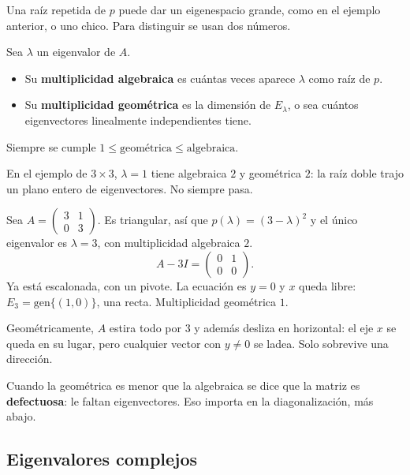 \documentclass[11pt,letterpaper]{article}
\begin{document}
Una raíz repetida de $p$ puede dar un eigenespacio grande, como en el
ejemplo anterior, o uno chico. Para distinguir se usan dos números.

\begin{definicion}[Multiplicidades]
    Sea $\lambda$ un eigenvalor de $A$.
    \begin{itemize}[itemsep=0.2em]
        \item Su \textbf{multiplicidad algebraica} es cuántas veces
              aparece $\lambda$ como raíz de $p$.
        \item Su \textbf{multiplicidad geométrica} es la dimensión de
              $E_\lambda$, o sea cuántos eigenvectores linealmente
              independientes tiene.
    \end{itemize}
    Siempre se cumple
    $1 \leq \text{geométrica} \leq \text{algebraica}$.
\end{definicion}

En el ejemplo de $3 \times 3$, $\lambda = 1$ tiene algebraica $2$ y
geométrica $2$: la raíz doble trajo un plano entero de eigenvectores.
No siempre pasa.

\begin{ejemplo}
    Sea $A = \begin{pmatrix} 3 & 1 \\ 0 & 3 \end{pmatrix}$. Es
    triangular, así que $p(\lambda) = (3 - \lambda)^2$ y el único
    eigenvalor es $\lambda = 3$, con multiplicidad algebraica $2$.
    \[
        A - 3I = \begin{pmatrix} 0 & 1 \\ 0 & 0 \end{pmatrix} .
    \]
    Ya está escalonada, con un pivote. La ecuación es $y = 0$ y $x$
    queda libre: $E_3 = \mathrm{gen}\{(1, 0)\}$, una recta.
    Multiplicidad geométrica $1$.

    Geométricamente, $A$ estira todo por $3$ y además desliza en
    horizontal: el eje $x$ se queda en su lugar, pero cualquier vector
    con $y \neq 0$ se ladea. Solo sobrevive una dirección.
\end{ejemplo}

Cuando la geométrica es menor que la algebraica se dice que la matriz
es \textbf{defectuosa}: le faltan eigenvectores. Eso importa en la
diagonalización, más abajo.


\subsection*{Eigenvalores complejos}
\end{document}
